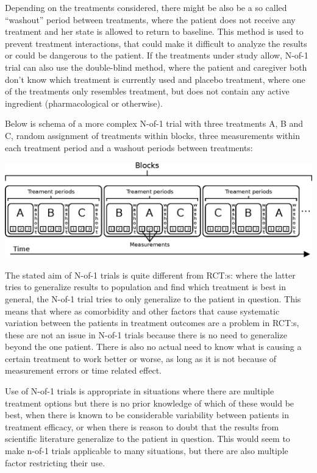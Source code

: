 \documentclass[12pt,a4paper,leqno]{report}
\theoremstyle{plain}
\theoremstyle{definition}
\theoremstyle{remark}
\begin{document}
Depending on
the treatments considered, there might be also be a so called ``washout'' period
between treatments, where the patient does not receive any treatment and her state is
allowed to return to baseline. This method is used to prevent treatment
interactions, that could make it difficult to analyze the results or could be
dangerous to the patient. If the treatments under study allow, N-of-1 trial can
also use the double-blind method, where the patient and caregiver both don't know
which treatment is currently used and placebo treatment, where one of the
treatments only resembles treatment, but does not contain any active
ingredient (pharmacological or otherwise).

Below is schema of a more complex
N-of-1 trial with three treatments A, B and C, random assignment of treatments within
blocks, three measurements within each treatment period and a washout periods between treatments:

\bigskip
{
    \centering
    \includegraphics{n-of-1_schema.eps}
    \par
}
\bigskip

The stated aim of N-of-1 trials is quite different from RCT:s: where the latter
tries to generalize results to population and find which treatment is best in
general, the N-of-1 trial tries to only generalize to the patient in question.
This means that where as comorbidity and other factors that cause
systematic variation between the patients in treatment outcomes are a problem
in RCT:s, these are not an issue in N-of-1 trials because there is no need to
generalize beyond the one patient. There is also no actual need to know
what is causing a certain treatment to work better or worse, as long
as it is not because of measurement errors or time related effect.

Use of N-of-1 trials is appropriate in situations where there are multiple
treatment options but there is no prior knowledge of which of these would be
best, when there is known to be considerable variability between patients in
treatment efficacy, or when there is reason to doubt that the results from
scientific literature generalize to the patient in question\cite{nofone}. This would seem to
make n-of-1 trials applicable to many situations, but there are also
multiple factor restricting their use\cite{nofone}.
\end{document}
